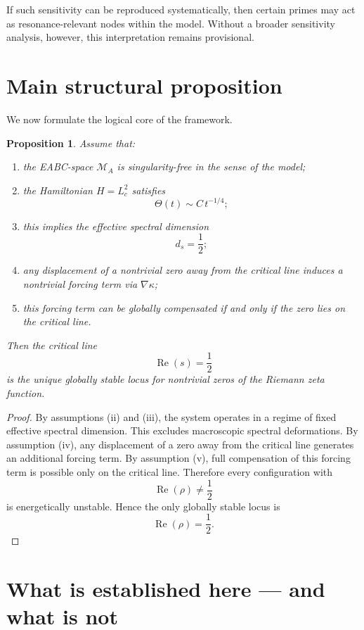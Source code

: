 \documentclass[11pt,a4paper]{amsart}
\theoremstyle{plain}
\newtheorem{proposition}[theorem]{Proposition}
\theoremstyle{definition}
\theoremstyle{remark}
\newcommand{\RePart}{\operatorname{Re}}
\newcommand{\grad}{\nabla}
\newcommand{\MA}{\mathcal{M}_A}
\newcommand{\ThetaH}{\Theta}
\newcommand{\kappaF}{\kappa}
\newcommand{\Lc}{L_c}
\begin{document}
	If such sensitivity can be reproduced systematically, then certain primes may act as resonance-relevant nodes within the model. Without a broader sensitivity analysis, however, this interpretation remains provisional.
	
	\section{Main structural proposition}
	
	We now formulate the logical core of the framework.
	
	\begin{proposition}
		Assume that:
		\begin{enumerate}[label=(\roman*)]
			\item the EABC-space $\MA$ is singularity-free in the sense of the model;
			\item the Hamiltonian $H=\Lc^2$ satisfies
			\[
			\ThetaH(t)\sim C\,t^{-1/4};
			\]
			\item this implies the effective spectral dimension
			\[
			d_s=\frac12;
			\]
			\item any displacement of a nontrivial zero away from the critical line induces a nontrivial forcing term via $\grad\kappaF$;
			\item this forcing term can be globally compensated if and only if the zero lies on the critical line.
		\end{enumerate}
		Then the critical line
		\[
		\RePart(s)=\frac12
		\]
		is the unique globally stable locus for nontrivial zeros of the Riemann zeta function.
	\end{proposition}
	
	\begin{proof}
		By assumptions (ii) and (iii), the system operates in a regime of fixed effective spectral dimension. This excludes macroscopic spectral deformations. By assumption (iv), any displacement of a zero away from the critical line generates an additional forcing term. By assumption (v), full compensation of this forcing term is possible only on the critical line. Therefore every configuration with
		\[
		\RePart(\rho)\neq\frac12
		\]
		is energetically unstable. Hence the only globally stable locus is
		\[
		\RePart(\rho)=\frac12.
		\]
	\end{proof}
	
	\section{What is established here --- and what is not}
	
\end{document}
